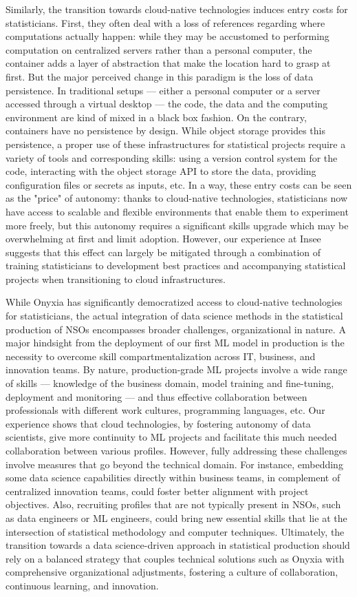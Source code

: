 \documentclass[graybox]{svmult}
\begin{document}
Similarly, the transition towards cloud-native technologies induces entry costs for statisticians. First, they often deal with a loss of references regarding where computations actually happen: while they may be accustomed to performing computation on centralized servers rather than a personal computer, the container adds a layer of abstraction that make the location hard to grasp at first. But the major perceived change in this paradigm is the loss of data persistence. In traditional setups — either a personal computer or a server accessed through a virtual desktop — the code, the data and the computing environment are kind of mixed in a black box fashion. On the contrary, containers have no persistence by design. While object storage provides this persistence, a proper use of these infrastructures for statistical projects require a variety of tools and corresponding skills: using a version control system for the code, interacting with the object storage API to store the data, providing configuration files or secrets as inputs, etc. In a way, these entry costs can be seen as the "price" of autonomy: thanks to cloud-native technologies, statisticians now have access to scalable and flexible environments that enable them to experiment more freely, but this autonomy requires a significant skills upgrade which may be overwhelming at first and limit adoption. However, our experience at Insee suggests that this effect can largely be mitigated through a combination of training statisticians to development best practices and accompanying statistical projects when transitioning to cloud infrastructures.

While Onyxia has significantly democratized access to cloud-native technologies for statisticians, the actual integration of data science methods in the statistical production of NSOs encompasses broader challenges, organizational in nature. A major hindsight from the deployment of our first ML model in production is the necessity to overcome skill compartmentalization across IT, business, and innovation teams. By nature, production-grade ML projects involve a wide range of skills — knowledge of the business domain, model training and fine-tuning, deployment and monitoring — and thus effective collaboration between professionals with different work cultures, programming languages, etc. Our experience shows that cloud technologies, by fostering autonomy of data scientists, give more continuity to ML projects and facilitate this much needed collaboration between various profiles. However, fully addressing these challenges involve measures that go beyond the technical domain. For instance, embedding some data science capabilities directly within business teams, in complement of centralized innovation teams, could foster better alignment with project objectives. Also, recruiting profiles that are not typically present in NSOs, such as data engineers or ML engineers, could bring new essential skills that lie at the intersection of statistical methodology and computer techniques. Ultimately, the transition towards a data science-driven approach in statistical production should rely on a balanced strategy that couples technical solutions such as Onyxia with comprehensive organizational adjustments, fostering a culture of collaboration, continuous learning, and innovation.



\end{document}
